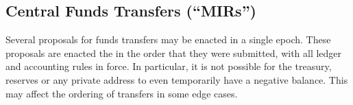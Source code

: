 \subsection{Central Funds Transfers (``MIRs'')}

Several proposals for funds transfers may be enacted in a single epoch.  These proposals are enacted the in the order that they were submitted, with all ledger and
accounting rules in force.  In particular, it is not possible for the treasury, reserves or any private address to even temporarily have a negative balance.  This may affect
the ordering of transfers in some edge cases.
